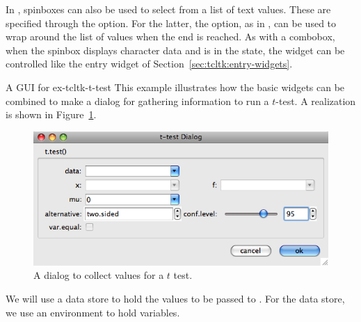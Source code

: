 In \TK, spinboxes can also be used to select from a list of text
values. These are specified through the 
option. For the latter, the  option, as in
, can be used to wrap around the list of values when
the end is reached. As with a combobox, when the \TK\/ spinbox
displays character data and is in the  state, the widget
can be controlled like the entry widget of
Section~\ref{sec:tcltk:entry-widgets}.


\begin{example}{A GUI for }{ex-tcltk-t-test}
This example illustrates how the basic widgets can be combined to make
a dialog for gathering information to run a $t$-test. A realization is shown in Figure~\ref{fig:fig-tcltk-t-test}.

\begin{figure}
  \centering
  \includegraphics[width=.75\textwidth]{fig-tcltk-t-test.png}
  \caption{A dialog to collect values for a $t$ test.}
  \label{fig:fig-tcltk-t-test}
\end{figure}





We will use a data store to hold the values to be passed to
. For the data store, we  use an environment to hold \Tcl\/ variables.

\begin{Schunk}
\end{Schunk}




\end{example}
